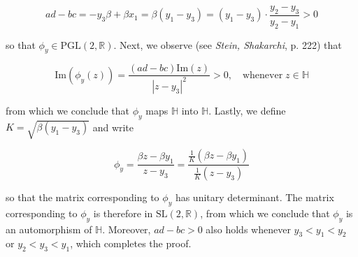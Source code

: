 \begin{solution}
  $$
  ad - bc = -y_3 \beta + \beta x_1 = \beta(y_1 - y_3) = (y_1 - y_3) \cdot \frac{y_2 - y_3}{y_2 - y_1} > 0
  $$

  so that $\phi_y \in \text{PGL}(2, \mathbb{R})$. Next, we observe (see \textit{Stein, Shakarchi}, p. 222) that

  $$
  \text{Im}\left(\phi_y(z)\right) = \frac{(ad - bc)\text{Im}(z)}{|z - y_3|^2} > 0, \quad \text{whenever} \; z \in \mathbb{H}
  $$

  from which we conclude that $\phi_y$ maps $\mathbb{H}$ into $\mathbb{H}$. Lastly, we define $K = \sqrt{\beta(y_1 - y_3)}$
  and write

  $$
  \phi_y = \frac{\beta z - \beta y_1}{z - y_3} 
         = \frac{\frac{1}{K}(\beta z - \beta y_1)}{\frac{1}{K} (z - y_3)}
  $$
  
  so that the matrix corresponding to $\phi_y$ has unitary determinant. The matrix corresponding to $\phi_y$ is 
  therefore in $\text{SL}(2, \mathbb{R})$, from which we conclude that $\phi_y$ is an automorphism of $\mathbb{H}$. Moreover, 
  $ad - bc > 0$ also holds whenever $y_3 < y_1 < y_2$ or $y_2 < y_3 < y_1$, which completes the proof.
  \ \\
\end{solution}
